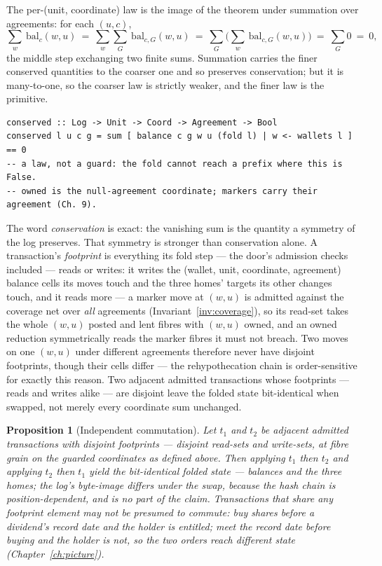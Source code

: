\documentclass[11pt,a4paper]{article}
\newtheorem{proposition}[definition]{Proposition}
\begin{document}
The per-(unit, coordinate) law is the image of the theorem under summation over agreements:
for each $(u,c)$,
\[
\sum_{w}\ \mathrm{bal}_c(w,u)\ =\ \sum_{w}\sum_{G}\ \mathrm{bal}_{c,G}(w,u)\ =\ \sum_{G}\Big(\sum_{w}\ \mathrm{bal}_{c,G}(w,u)\Big)\ =\ \sum_{G} 0\ =\ 0,
\]
the middle step exchanging two finite sums. Summation carries the finer conserved
quantities to the coarser one and so preserves conservation; but it is many-to-one, so the
coarser law is strictly weaker, and the finer law is the primitive.

\begin{lstlisting}
conserved :: Log -> Unit -> Coord -> Agreement -> Bool
conserved l u c g = sum [ balance c g w u (fold l) | w <- wallets l ] == 0
-- a law, not a guard: the fold cannot reach a prefix where this is False.
-- owned is the null-agreement coordinate; markers carry their agreement (Ch. 9).
\end{lstlisting}

The word \emph{conservation} is exact: the vanishing sum is the quantity a
symmetry of the log preserves. That symmetry is stronger than conservation alone. A
transaction's \emph{footprint} is everything its fold step --- the door's admission
checks included --- reads or writes: it writes the (wallet, unit, coordinate, agreement)
balance cells its moves touch and the three homes' targets its other changes touch, and
it reads more --- a marker move at $(w,u)$ is admitted against the coverage net over
\emph{all} agreements (Invariant~\ref{inv:coverage}), so its read-set takes the whole
$(w,u)$ posted and lent fibres with $(w,u)$ owned, and an owned reduction symmetrically
reads the marker fibres it must not breach. Two moves on one $(w,u)$ under different
agreements therefore never have disjoint footprints, though their cells differ --- the
rehypothecation chain is order-sensitive for exactly this reason. Two adjacent admitted
transactions whose footprints --- reads and writes alike --- are disjoint leave the
folded state bit-identical when swapped, not merely every coordinate sum unchanged.

\begin{proposition}[Independent commutation]\label{prop:independent-commute}
Let $t_1$ and $t_2$ be adjacent admitted transactions with disjoint footprints ---
disjoint read-sets and write-sets, at fibre grain on the guarded coordinates as defined
above. Then applying $t_1$ then $t_2$ and applying $t_2$ then $t_1$ yield the
bit-identical \emph{folded state} --- balances and the three homes; the log's byte-image
differs under the swap, because the hash chain is position-dependent, and is no part of
the claim. Transactions that share any footprint element may not be
presumed to commute: buy shares before a dividend's record date and the holder is
entitled; meet the record date before buying and the holder is not, so the two orders
reach different state (Chapter~\ref{ch:picture}).
\end{proposition}
\end{document}
